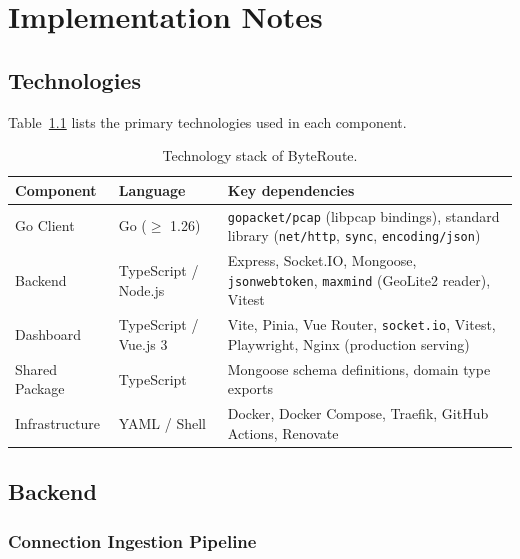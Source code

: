 \documentclass[12pt]{report}
\begin{document}
\chapter{Implementation Notes}
\label{chap:implementation}

\section{Technologies}

Table~\ref{tab:tech} lists the primary technologies used in each component.

\begin{table}[H]
  \centering
  \caption{Technology stack of ByteRoute.}
  \label{tab:tech}
  \begin{tabularx}{\textwidth}{llX}
    \toprule
    \textbf{Component} & \textbf{Language} & \textbf{Key dependencies} \\
    \midrule
    Go Client &
      Go ($\geq$ 1.26) &
      \texttt{gopacket/pcap} (libpcap bindings), standard library
      (\texttt{net/http}, \texttt{sync}, \texttt{encoding/json}) \\
    \addlinespace
    Backend &
      TypeScript / Node.js &
      Express, Socket.IO, Mongoose, \texttt{jsonwebtoken},
      \texttt{maxmind} (GeoLite2 reader), Vitest \\
    \addlinespace
    Dashboard &
      TypeScript / Vue.js 3 &
      Vite, Pinia, Vue Router, \texttt{socket.io}, Vitest, Playwright, Nginx
      (production serving) \\
    \addlinespace
    Shared Package &
      TypeScript &
      Mongoose schema definitions, domain type exports \\
    \addlinespace
    Infrastructure &
      YAML / Shell &
      Docker, Docker Compose, Traefik, GitHub Actions, Renovate \\
    \bottomrule
  \end{tabularx}
\end{table}

\section{Backend}

\subsection{Connection Ingestion Pipeline}
\end{document}
